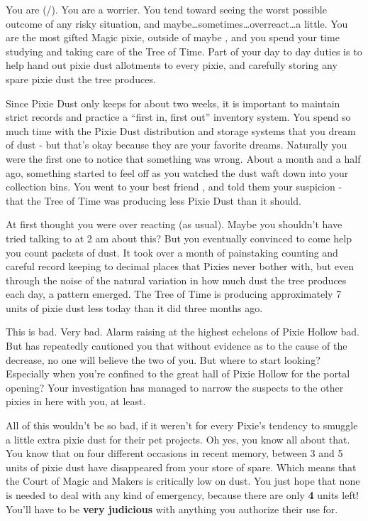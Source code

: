 \documentclass[char]{PP}
\begin{document}
\name{\cMTree{}}

You are \cMTree{} (\cMTree{\They}/\cMTree{\Them}). You are a worrier. You tend toward seeing the worst possible outcome of any risky situation, and maybe\ldots sometimes\ldots overreact\ldots a little. You are the most gifted Magic pixie, outside of maybe \cMHead{} \cMHead{\themself}, and you spend your time studying and taking care of the Tree of Time. Part of your day to day duties is to help hand out pixie dust allotments to every pixie, and carefully storing any spare pixie dust the tree produces.

Since Pixie Dust only keeps for about two weeks, it is important to maintain strict records and practice a “first in, first out” inventory system. You spend so much time with the Pixie Dust distribution and storage systems that you dream of dust - but that’s okay because they are your favorite dreams. Naturally you were the first one to notice that something was wrong. About a month and a half ago, something started to feel off as you watched the dust waft down into your collection bins. You went to your best friend \cSHelp{}, and told them your suspicion - that the Tree of Time was producing less Pixie Dust than it should.

At first \cSHelp{} thought you were over reacting (as usual). Maybe you shouldn’t have tried talking to at 2 am about this? But you eventually convinced \cSHelp{\them} to come help you count packets of dust. It took over a month of painstaking counting and careful record keeping to decimal places that Pixies never bother with, but even through the noise of the natural variation in how much dust the tree produces each day, a pattern emerged. The Tree of Time is producing approximately 7 units of pixie dust less today than it did three months ago.

This is bad. Very bad. Alarm raising at the highest echelons of Pixie Hollow bad. But \cSHelp{} has repeatedly cautioned you that without evidence as to the cause of the decrease, no one will believe the two of you. But where to start looking? Especially when you’re confined to the great hall of Pixie Hollow for the portal opening?  Your investigation has managed to narrow the suspects to the other pixies in here with you, at least.

All of this wouldn’t be so bad, if it weren’t for every Pixie’s tendency to smuggle a little extra pixie dust for their pet projects. Oh yes, you know all about that. You know that on four different occasions in recent memory, between 3 and 5 units of pixie dust have disappeared from your store of spare. Which means that the Court of Magic and Makers is critically low on dust. You just hope that none is needed to deal with any kind of emergency, because there are only \textbf{4} units left! You’ll have to be \textbf{very judicious} with anything you authorize their use for.
\end{document}
